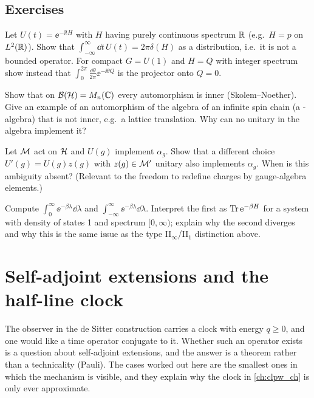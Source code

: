 \subsection*{Exercises}
\begin{exercise}\label{ex:groups:1}
Let $U(t)=\ee^{-\ii tH}$ with $H$ having purely continuous spectrum $\mathbb{R}$ (e.g.\ $H=p$ on $L^2(\mathbb{R})$). Show that $\int_{-\infty}^\infty\dd t\,U(t)=2\pi\delta(H)$ as a distribution, i.e.\ it is not a bounded operator. For compact $G=U(1)$ and $H=Q$ with integer spectrum show instead that $\int_0^{2\pi}\frac{\dd\theta}{2\pi}\ee^{-\ii\theta Q}$ is the projector onto $Q=0$.
\end{exercise}
\begin{exercise}\label{ex:groups:2}
Show that on $\mathcal{B}(\mathcal{H})=M_n(\mathbb{C})$ every automorphism is inner (Skolem--Noether). Give an example of an automorphism of the algebra of an infinite spin chain (a \cstar-algebra) that is not inner, e.g.\ a lattice translation. Why can no unitary in the algebra implement it?
\end{exercise}
\begin{exercise}\label{ex:groups:3}
Let $\mathcal{M}$ act on $\mathcal{H}$ and $U(g)$ implement $\alpha_g$. Show that a different choice $U'(g)=U(g)z(g)$ with $z(g)\in\mathcal{M}'$ unitary also implements $\alpha_g$. When is this ambiguity absent? (Relevant to the freedom to redefine charges by gauge-algebra elements.)
\end{exercise}
\begin{exercise}\label{ex:groups:4}
Compute $\int_0^\infty\ee^{-\beta\lambda}\dd\lambda$ and $\int_{-\infty}^{\infty}\ee^{-\beta\lambda}\dd\lambda$. Interpret the first as $\operatorname{Tr}\mathrm{e}^{-\beta H}$ for a system with density of states 1 and spectrum $[0,\infty)$; explain why the second diverges and why this is the same issue as the type II$_\infty$/II$_1$ distinction above.
\end{exercise}


\section{Self-adjoint extensions and the half-line clock}\label{ch:halfline}
\begin{physmotiv}
The observer in the de Sitter construction carries a clock with energy $q\ge0$, and one would like a time operator conjugate to it. Whether such an operator exists is a question about self-adjoint extensions, and the answer is a theorem rather than a technicality (Pauli). The cases worked out here are the smallest ones in which the mechanism is visible, and they explain why the clock in \cref{ch:clpw_ch} is only ever approximate.
\end{physmotiv}

